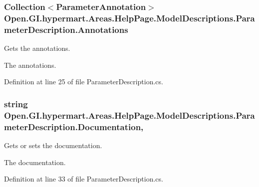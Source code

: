 \subsubsection[{Annotations}]{\setlength{\rightskip}{0pt plus 5cm}Collection$<${\bf Parameter\+Annotation}$>$ Open.\+G\+I.\+hypermart.\+Areas.\+Help\+Page.\+Model\+Descriptions.\+Parameter\+Description.\+Annotations\hspace{0.3cm}{\ttfamily [get]}}\label{class_open_1_1_g_i_1_1hypermart_1_1_areas_1_1_help_page_1_1_model_descriptions_1_1_parameter_description_ab64b50d81b22dc90c5d40081722ff711}


Gets the annotations. 

The annotations. 

Definition at line 25 of file Parameter\+Description.\+cs.

\hypertarget{class_open_1_1_g_i_1_1hypermart_1_1_areas_1_1_help_page_1_1_model_descriptions_1_1_parameter_description_a14b38b56f23972d23b7fc5594b5ac15f}{}
\subsubsection[{Documentation}]{\setlength{\rightskip}{0pt plus 5cm}string Open.\+G\+I.\+hypermart.\+Areas.\+Help\+Page.\+Model\+Descriptions.\+Parameter\+Description.\+Documentation\hspace{0.3cm}{\ttfamily [get]}, {\ttfamily [set]}}\label{class_open_1_1_g_i_1_1hypermart_1_1_areas_1_1_help_page_1_1_model_descriptions_1_1_parameter_description_a14b38b56f23972d23b7fc5594b5ac15f}


Gets or sets the documentation. 

The documentation. 

Definition at line 33 of file Parameter\+Description.\+cs.

\hypertarget{class_open_1_1_g_i_1_1hypermart_1_1_areas_1_1_help_page_1_1_model_descriptions_1_1_parameter_description_a213cc3debc198eb331e57e38ecdca4ed}{}
